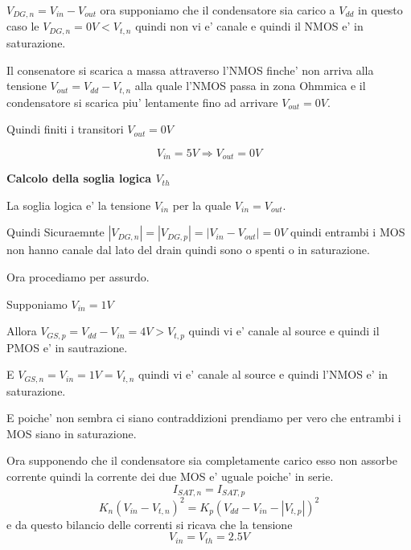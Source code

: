 \documentclass[\main/main.tex]{subfiles}
\begin{document}
$V_{DG,n} = V_{in} - V_{out}$ ora supponiamo che il condensatore sia carico a $V_{dd}$ in questo caso le $V_{DG,n} = 0V < V_{t,n}$ quindi non vi e' canale e quindi il NMOS e' in saturazione.

Il consenatore si scarica a massa attraverso l'NMOS finche' non arriva alla tensione $V_{out} = V_{dd} - V_{t,n}$ alla quale l'NMOS passa in zona Ohmmica e il condensatore si scarica piu' lentamente fino ad arrivare $V_{out} = 0V$.

Quindi finiti i transitori $V_{out} = 0V$

\[V_{in} = 5V \Rightarrow V_{out} = 0V\]

\textbf{Calcolo della soglia logica $V_{th}$}

La soglia logica e' la tensione $V_{in}$ per la quale $V_{in} = V_{out}$.

Quindi Sicuraemnte $|V_{DG,n}| = |V_{DG,p}| = |V_{in} - V_{out}| = 0V$ quindi entrambi i MOS non hanno canale dal lato del drain quindi sono o spenti o in saturazione.

Ora procediamo per assurdo.

Supponiamo $V_{in} = 1V$

Allora $V_{GS,p} = V_{dd} - V_{in} = 4V > V_{t,p}$ quindi vi e' canale al source e quindi il PMOS e' in sautrazione.

E $V_{GS,n} = V_{in} = 1V = V_{t,n}$ quindi vi e' canale al source e quindi l'NMOS e' in saturazione.

E poiche' non sembra ci siano contraddizioni prendiamo per vero che entrambi i MOS siano in saturazione.

Ora supponendo che il condensatore sia completamente carico esso non assorbe corrente quindi la corrente dei due MOS e' uguale poiche' in serie.
\[I_{SAT,n} = I_{SAT,p}\]
\[K_n \left(V_{in} - V_{t,n} \right )^2 = K_p \left(V_{dd} - V_{in} - |V_{t,p}| \right )^2\]
e da questo bilancio delle correnti si ricava che la tensione
\[V_{in} = V_{th} = 2.5V\]
\end{document}
